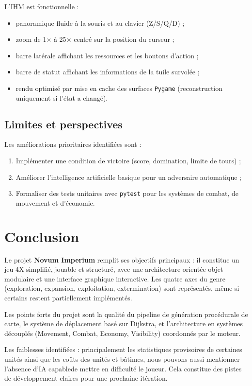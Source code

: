 \documentclass[12pt, a4paper]{article}
\begin{document}
L'IHM est fonctionnelle :
\begin{itemize}
    \item panoramique fluide à la souris et au clavier (Z/S/Q/D) ;
    \item zoom de 1$\times$ à 25$\times$ centré sur la position du curseur ;
    \item barre latérale affichant les ressources et les boutons d'action ;
    \item barre de statut affichant les informations de la tuile survolée ;
    \item rendu optimisé par mise en cache des surfaces \texttt{Pygame} (reconstruction uniquement
    si l'état a changé).
\end{itemize}

\subsection{Limites et perspectives}

Les améliorations prioritaires identifiées sont :
\begin{enumerate}
    \item Implémenter une condition de victoire (score, domination, limite de tours) ;
    \item Améliorer l'intelligence artificielle basique pour un adversaire automatique ;
    \item Formaliser des tests unitaires avec \texttt{pytest} pour les systèmes de combat,
    de mouvement et d'économie.
\end{enumerate}



\section{Conclusion}


Le projet \textbf{Novum Imperium} remplit ses objectifs principaux : il constitue un jeu 4X
simplifié, jouable et structuré, avec une architecture orientée objet modulaire et une interface
graphique interactive. Les quatre axes du genre (exploration, expansion, exploitation,
extermination) sont représentés, même si certains restent partiellement implémentés.

Les points forts du projet sont la qualité du pipeline de génération procédurale de carte,
le système de déplacement basé sur Dijkstra, et l'architecture en systèmes découplés
(Movement, Combat, Economy, Visibility) coordonnés par le moteur.

Les faiblesses identifiées : principalement les statistiques provisoires de certaines unités ainsi que les coûts des unités et bâtimes, nous pouvons aussi mentionner l'absence d'IA capablede mettre en difficulté le joueur. Cela constitue des pistes de développement claires pour une prochaine itération.
\end{document}
